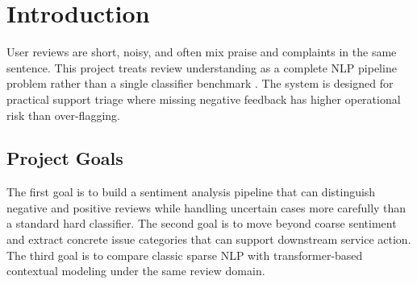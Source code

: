 \documentclass[12pt,a4paper]{article}
\begin{document}
\newpage
\renewcommand{\abstractname}{\Large\bfseries\color{primaryblue} Abstract}
\begin{abstract}
This report presents a consolidated NLP study in formal academic structure. The project addresses three tasks: binary sentiment classification with uncertainty control, multi-label issue extraction, and transformer-based extension. The source corpus contains 152,410 reviews; the issue annotation set contains 19,000 rows. In classic sentiment, variant V6 (word 1--2 + char 3--5 + negation, class weight w10) reaches test \texttt{precision\_0=0.677}, \texttt{recall\_0=0.932}, and \texttt{F2\_0=0.867}, with selective coverage 0.885 under threshold band 0.40/0.60. The transformer sentiment extension reaches \texttt{accuracy=0.966}, \texttt{precision\_0=0.799}, \texttt{recall\_0=0.853}, and \texttt{F2\_0=0.842}, with coverage 0.910. For issue extraction on the 3,800-row split, OVR Logistic reaches \texttt{micro-F1=0.780} and \texttt{macro-F1=0.387}, OVR LinearSVM reaches \texttt{micro-F1=0.771} and \texttt{macro-F1=0.405}, while dummy labelset baselines show high micro-F1 (\texttt{0.809}) but very low macro-F1 (\texttt{0.101}) due to majority-label dominance. The no-new-data upgrade package adds syllabus baselines, n-gram language modeling, evaluation-rigor artifacts, and transformer issue-routing experiments. All quantitative statements are sourced from saved experiment artifacts under \texttt{results/}.
\end{abstract}

\tableofcontents
\newpage
{}

\section{Introduction}
User reviews are short, noisy, and often mix praise and complaints in the same sentence. This project treats review understanding as a complete NLP pipeline problem rather than a single classifier benchmark \cite{jurafsky2026,turney2002}. The system is designed for practical support triage where missing negative feedback has higher operational risk than over-flagging.

\subsection{Project Goals}
The first goal is to build a sentiment analysis pipeline that can distinguish negative and positive reviews while handling uncertain cases more carefully than a standard hard classifier. The second goal is to move beyond coarse sentiment and extract concrete issue categories that can support downstream service action. The third goal is to compare classic sparse NLP with transformer-based contextual modeling under the same review domain.
\end{document}
